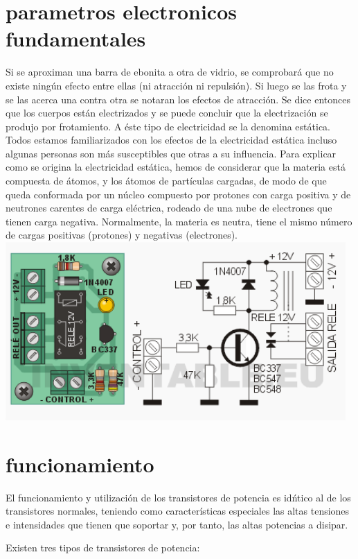 \documentclass[12pt,a4paper]{article}
\begin{document}
\section{parametros electronicos fundamentales}
Si se aproximan una barra de ebonita a otra de vidrio, se comprobar\'a que no existe ning\'un efecto entre ellas (ni atracci\'on ni repulsi\'on). Si luego se las frota y se las acerca una contra otra se notaran los efectos de atracci\'on. Se dice entonces que los cuerpos est\'an electrizados y
se puede concluir que la electrizaci\'on se produjo por frotamiento. A \'este tipo de electricidad se la denomina est\'atica. Todos estamos familiarizados con los efectos de la electricidad est\'atica
incluso algunas personas son m\'as susceptibles que otras a su influencia. Para explicar como se origina la electricidad est\'atica, hemos de considerar que la materia est\'a compuesta de \'atomos, y los \'atomos de part\'iculas cargadas, de modo de que queda conformada por un n\'ucleo compuesto por protones con carga positiva y de neutrones carentes de carga el\'ectrica, rodeado de una nube de electrones que tienen carga negativa. Normalmente, la materia es neutra, tiene el mismo n\'umero de cargas positivas (protones) y negativas (electrones).\\ 
\includegraphics[width=13cm]{conexion-rele-transistor.png} 
\newpage
\section{funcionamiento}
El funcionamiento y utilizaci\'on de los transistores de potencia es id\'ntico al de los transistores normales, teniendo como caracter\'isticas especiales las altas tensiones e intensidades que tienen que soportar y, por tanto, las altas potencias a disipar.

Existen tres tipos de transistores de potencia:\\
\end{document}
